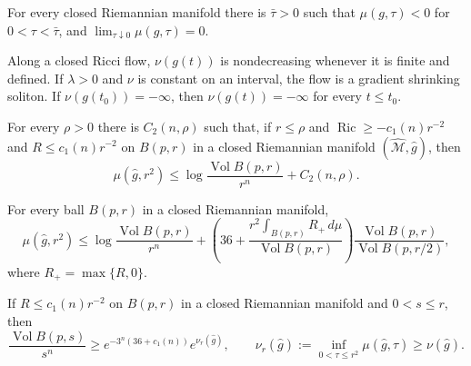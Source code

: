 \begin{lemma}
\label{lem:chow-ii-appd-mu-small-tau}
For every closed Riemannian manifold there is $\bar\tau>0$ such that
$\mu(g,\tau)<0$ for $0<\tau<\bar\tau$, and
$\lim_{\tau\downarrow0}\mu(g,\tau)=0$.
\end{lemma}

\begin{lemma}
\label{lem:chow-ii-appd-nu-monotonicity}
Along a closed Ricci flow, $\nu(g(t))$ is nondecreasing whenever it is finite
and defined. If $\lambda>0$ and $\nu$ is constant on an interval, the flow is
a gradient shrinking soliton. If $\nu(g(t_0))=-\infty$, then
$\nu(g(t))=-\infty$ for every $t\leq t_0$.
\end{lemma}

\begin{proposition}
\label{prop:chow-ii-appd-mu-controls-volume-ratios}
For every $\rho>0$ there is $C_2(n,\rho)$ such that, if $r\leq\rho$ and
$\operatorname{Ric}\geq-c_1(n)r^{-2}$ and $R\leq c_1(n)r^{-2}$ on
$B(p,r)$ in a closed Riemannian manifold $(\widehat{\mathcal M},\hat g)$,
then
\[
 \mu(\hat g,r^2)\leq
 \log\frac{\operatorname{Vol}B(p,r)}{r^n}+C_2(n,\rho).
\]
\end{proposition}

\begin{proposition}
\label{prop:chow-ii-appd-bound-mu-local-geometry}
For every ball $B(p,r)$ in a closed Riemannian manifold,
\[
 \mu(\hat g,r^2)\leq\log\frac{\operatorname{Vol}B(p,r)}{r^n}
 +\left(36+\frac{r^2\int_{B(p,r)}R_+\,d\mu}
 {\operatorname{Vol}B(p,r)}\right)
 \frac{\operatorname{Vol}B(p,r)}{\operatorname{Vol}B(p,r/2)},
\]
where $R_+=\max\{R,0\}$.
\end{proposition}

\begin{proposition}
\label{prop:chow-ii-appd-bound-volume-ratios-nu}
If $R\leq c_1(n)r^{-2}$ on $B(p,r)$ in a closed Riemannian manifold and
$0<s\leq r$, then
\[
 \frac{\operatorname{Vol}B(p,s)}{s^n}\geq
 e^{-3^n(36+c_1(n))}e^{\nu_r(\hat g)},
 \qquad
 \nu_r(\hat g):=\inf_{0<\tau\leq r^2}\mu(\hat g,\tau)\geq\nu(\hat g).
\]
\end{proposition}

